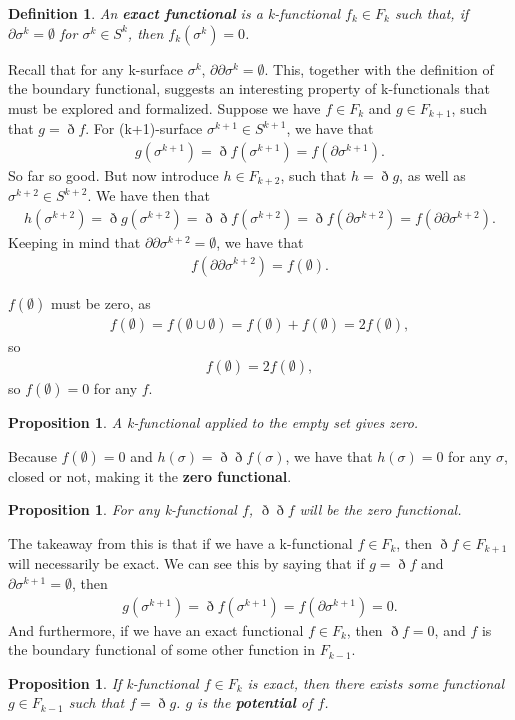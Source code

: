 \documentclass{book}
\newtheorem{defn}[equation]{Definition}
\newtheorem{prop}[equation]{Proposition}
\begin{document}
\begin{defn}
	An \textbf{exact functional} is a k-functional $f_k \in F_k$ such that, if $\partial\sigma^k = \emptyset$ for $\sigma^k \in S^k$, then $f_k(\sigma^k) = 0$. 
\end{defn}


Recall that for any k-surface $\sigma^k$, $\partial\partial\sigma^k = \emptyset$. This, together with the definition of the boundary functional, suggests an interesting property of k-functionals that must be explored and formalized. Suppose we have $f \in F_k$ and $g \in F_{k+1}$, such that $g = \eth f$. For (k+1)-surface $\sigma^{k+1} \in S^{k+1}$, we have that \begin{gather} g(\sigma^{k+1}) = \eth f(\sigma^{k+1}) = f(\partial\sigma^{k+1}). \end{gather} So far so good. But now introduce $h \in F_{k+2}$, such that $h = \eth g$, as well as $\sigma^{k+2} \in S^{k+2}$. We have then that \begin{gather} h(\sigma^{k+2}) = \eth g(\sigma^{k+2}) = \eth\eth f(\sigma^{k+2}) = \eth f(\partial\sigma^{k+2}) = f(\partial\partial\sigma^{k+2}). \end{gather} Keeping in mind that $\partial\partial\sigma^{k+2} = \emptyset$, we have that \begin{gather}f(\partial\partial\sigma^{k+2}) = f(\emptyset). \end{gather}

$f(\emptyset)$ must be zero, as \begin{gather} f(\emptyset) = f(\emptyset\cup\emptyset) = f(\emptyset) + f(\emptyset) = 2f(\emptyset),\end{gather} so \begin{gather} f(\emptyset) = 2f(\emptyset), \end{gather} so $f(\emptyset) = 0$ for any $f$. 

\begin{prop}
	A k-functional applied to the empty set gives zero. 
\end{prop}

Because $f(\emptyset) = 0$ and $h(\sigma) = \eth\eth f(\sigma)$, we have that $h(\sigma) = 0$ for any $\sigma$, closed or not, making it the \textbf{zero functional}.

\begin{prop}
	For any k-functional $f$, $\eth\eth f$ will be the zero functional. 
\end{prop}

The takeaway from this is that if we have a k-functional $f \in F_k$, then $\eth f \in F_{k+1}$ will necessarily be exact. We can see this by saying that if $g = \eth f$ and $\partial\sigma^{k+1} = \emptyset$, then \begin{gather} g(\sigma^{k+1}) = \eth f(\sigma^{k+1}) = f(\partial\sigma^{k+1}) = 0.\end{gather} And furthermore, if we have an exact functional $f \in F_k$, then $\eth f = 0$, and $f$ is the boundary functional of some other function in $F_{k-1}$. 
\begin{prop}
	If k-functional $f \in F_k$ is exact, then there exists some functional $g \in F_{k-1}$ such that $f = \eth g$. $g$ is the \textbf{potential} of $f$.  
\end{prop}
\end{document}
